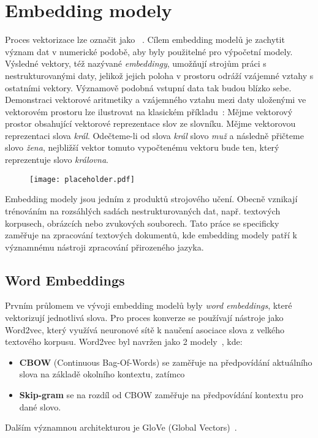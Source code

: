 \section{Embedding modely}
Proces vektorizace lze označit jako ~\cite{vdbms}. Cílem embedding modelů je zachytit význam dat v numerické podobě, aby byly použitelné pro výpočetní modely. Výsledné vektory, též nazývané \textit{embeddingy}, umožňují strojům práci s nestrukturovanými daty, jelikož jejich poloha v prostoru odráží vzájemné vztahy s ostatními vektory. Významově podobná vstupní data tak budou blízko sebe. Demonstraci vektorové aritmetiky a vzájemného vztahu mezi daty uloženými ve vektorovém prostoru lze ilustrovat na klasickém příkladu~\cite{illustratedw2c}: Mějme vektorový prostor obsahující vektorové reprezentace slov ze slovníku. Mějme vektorovou reprezentaci slova \textit{král}. Odečteme-li od slova \textit{král} slovo \textit{muž} a následně přičteme slovo \textit{žena}, nejbližší vektor tomuto vypočtenému vektoru bude ten, který reprezentuje slovo \textit{královna}.

\begin{figure}[H]
    \centering
    \texttt{[image: placeholder.pdf]}
    \caption{}
    \label{fig:vector2D}
\end{figure}

Embedding modely jsou jedním z produktů strojového učení. Obecně vznikají trénováním na rozsáhlých sadách nestrukturovaných dat, např. textových korpusech, obrázcích nebo zvukových souborech. Tato práce se specificky zaměřuje na zpracování textových dokumentů, kde embedding modely patří k významnému nástroji zpracování přirozeného jazyka. 

\subsection{Word Embeddings}
Prvním průlomem ve vývoji embedding modelů byly \textit{word embeddings}, které vektorizují jednotlivá slova. Pro proces konverze se používají nástroje jako Word2vec, který využívá neuronové sítě k naučení asociace slova z velkého textového korpusu. Word2vec byl navržen jako 2 modely~\cite{from_word_to_sense}, kde:
\begin{itemize}
    \item \textbf{CBOW} (Continuous Bag-Of-Words) se zaměřuje na předpovídání aktuálního slova na základě okolního kontextu, zatímco
    \item \textbf{Skip-gram} se na rozdíl od CBOW zaměřuje na předpovídání kontextu pro dané slovo.
\end{itemize} 
Dalším významnou architekturou je GloVe (Global Vectors)~\cite{glove}.

